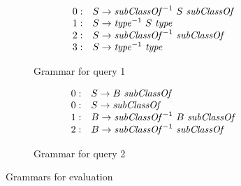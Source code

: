 \begin{figure*}%
   \begin{center}
   \centering
   \begin{subfigure}[b]{0.4\textwidth}

   \[
\begin{array}{rl}
   0: & S \rightarrow \text{\textit{subClassOf}}^{-1} \ S \ \text{\textit{subClassOf}} \\ 
   1: & S \rightarrow \text{\textit{type}}^{-1} \ S \ \text{\textit{type}} \\ 
   2: & S \rightarrow \text{\textit{subClassOf}}^{-1} \ \text{\textit{subClassOf}} \\ 
   3: & S \rightarrow \text{\textit{type}}^{-1} \ \text{\textit{type}} \\ 
\end{array}
\]
   \caption{Grammar for query 1}
   \label{grammarQ1}
   \end{subfigure}
   \hspace{2em}
   \begin{subfigure}[b]{0.4\textwidth}
   \[
\begin{array}{rl}
   0: & S \rightarrow B \ \text{\textit{subClassOf}} \\ 
   0: & S \rightarrow \text{\textit{subClassOf}} \\ 
   1: & B \rightarrow \text{\textit{subClassOf}}^{-1} \ B \ \text{\textit{subClassOf}} \\
   2: & B \rightarrow \text{\textit{subClassOf}}^{-1} \ \text{\textit{subClassOf}} \\ 
\end{array}
\]
   \caption{Grammar for query 2}
   \label{grammarQ2}        
   \end{subfigure}
   \end{center}
   \caption{Grammars for evaluation}
    \label{GrammarsForEvaluation}
\end{figure*}



